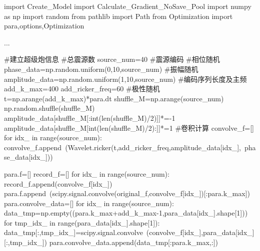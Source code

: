\documentclass[12pt]{article}
\begin{document}
\begin{python}
import Create_Model
import Calculate_Gradient_NoSave_Pool
import numpy as np
import random
from pathlib import Path
from Optimization import para,options,Optimization

...

#建立超级炮信息
#总震源数
source_num=40
#震源编码
#相位随机
phase_data=np.random.uniform(0,10,source_num)
#振幅随机
amplitude_data=np.random.uniform(1,10,source_num)
#编码序列长度及主频
add_k_max=400
add_ricker_freq=60
#极性随机
t=np.arange(add_k_max)*para.dt
shuffle_M=np.arange(source_num)
np.random.shuffle(shuffle_M)
amplitude_data[shuffle_M[:int(len(shuffle_M)/2)]]*=-1
amplitude_data[shuffle_M[int(len(shuffle_M)/2):]]*=1
#卷积计算
convolve_f=[]
for idx_ in range(source_num):
    convolve_f.append\
    (Wavelet.ricker(t,add_ricker_freq,amplitude_data[idx_],\
    phase_data[idx_]))   
    
para.f=[]
record_f=[]
for idx_ in range(source_num):
    record_f.append(convolve_f[idx_])
    para.f.append\
    (scipy.signal.convolve(original_f,convolve_f[idx_])[:para.k_max])
para.convolve_data=[]
for idx_ in range(source_num):
    data_tmp=np.empty((para.k_max+add_k_max-1,para_data[idx_].shape[1]))
    for tmp_idx_ in range(para_data[idx_].shape[1]):
        data_tmp[:,tmp_idx_]=scipy.signal.convolve\
        (convolve_f[idx_],para_data[idx_][:,tmp_idx_])
    para.convolve_data.append(data_tmp[:para.k_max,:])        
            

\end{python}
\end{document}
